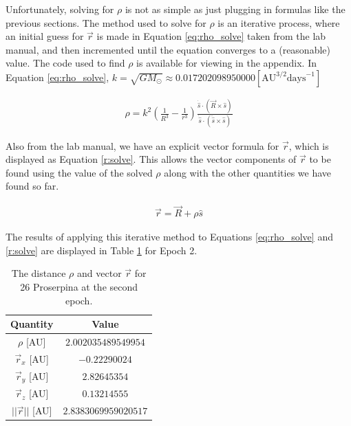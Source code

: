 \documentclass{article}
\begin{document}
Unfortunately, solving for $\rho$ is not as simple as just plugging in formulas like the previous sections. The method used to solve for $\rho$ is an iterative process, where an initial guess for $\vec{r}$ is made in 
Equation \ref{eq:rho_solve} taken from the lab manual, and then incremented until the equation converges to a (reasonable) value. The code used to find $\rho$ is available for viewing in the appendix. In Equation \ref{eq:rho_solve},
$k = \sqrt{GM_{\odot}} \approx  0.017202098950000 [\text{AU}^{3/2} \text{days}^{-1}]$

\begin{equation}
    \label{eq:rho_solve}
    \begin{aligned}
        \rho = k^2(\frac{1}{R^3} - \frac{1}{r^3})\frac{\dot{\hat{s}} \cdot (\vec{R} \times \hat{s})}{\dot{\hat{s}} \cdot (\ddot{\hat{s}} \times \hat{s})}
    \end{aligned}
\end{equation}

Also from the lab manual, we have an explicit vector formula for $\vec{r}$, which is displayed as Equation \ref{r:solve}. This allows the vector components of $\vec{r}$ to be found 
using the value of the solved $\rho$ along with the other quantities we have found so far. 

\begin{equation}
    \label{r:solve}
    \begin{aligned}
        \vec{r} = \vec{R} + \rho\hat{s}
    \end{aligned}
\end{equation}

\noindent
The results of applying this iterative method to Equations \ref{eq:rho_solve} and \ref{r:solve} are displayed in Table \ref{tab:rho_r} for Epoch 2.

\begin{table}[H]
\centering
\begin{tabular}{|c|c|}
    \hline 
    \textbf{Quantity} & \textbf{Value} \\
    \hline
    $\rho$ [AU] & $2.002035489549954$ \\
    \hline
    $\vec{r}_{x}$ [AU] & $-0.22290024$ \\
    \hline
    $\vec{r}_{y}$ [AU] & $2.82645354$ \\
    \hline
    $\vec{r}_{z}$ [AU] & $0.13214555$ \\
    \hline
    $||\vec{r}||$ [AU] & $2.8383069959020517$ \\
    \hline
\end{tabular}
    \caption{The distance $\rho$ and vector $\vec{r}$ for 26 Proserpina at the second epoch.}
    \label{tab:rho_r}
\end{table}
\end{document}
